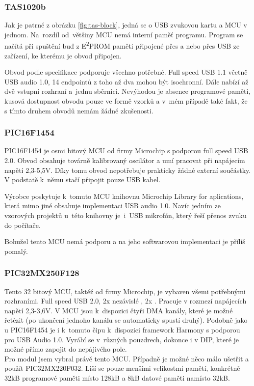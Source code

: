 \subsubsection{TAS1020b}	

Jak je patrné z obrázku \ref{fig:tas-block}, jedná se o USB \iis zvukovou kartu a MCU v jednom. Na~rozdíl od~většiny MCU nemá interní paměť programu. Program se načítá při spuštění buď z E\textsuperscript{2}PROM  paměti připojené přes \iic a nebo přes USB ze zařízení, ke kterému je obvod připojen.

Obvod podle specifikace \cite{tas} podporuje všechno potřebné. Full speed USB 1.1 včetně USB audio 1.0, 14 endpointů z toho až dva mohou být isochronní. Dále nabízí až dvě vstupní \iis rozhraní a~jednu \iic sběrnici. Nevýhodou je absence programové paměti, kusová dostupnost obvodu pouze ve formě vzorků a v~mém případě také fakt, že s tímto druhem obvodů nemám žádné zkušenosti.

\subsubsection{PIC16F1454}
PIC16F1454 je osmi bitový MCU od firmy Microchip s podporou full speed USB 2.0. Obvod obsahuje továrně kalibrovaný oscilátor a umí pracovat při napájecím napětí 2,3-5,5V. Díky tomu obvod nepotřebuje prakticky žádné externí součástky. V podstatě k~němu stačí připojit pouze USB kabel.

Výrobce poskytuje k~tomuto MCU knihovnu Microchip Library for aplications, která mimo jiné obsahuje implementaci USB audio 1.0. Navíc jedním ze vzorových projektů u~této knihovny je~i~USB mikrofón, který řeší přenos zvuku do počítače.

Bohužel tento MCU nemá podporu \iis a na jeho softwarovou implementaci je příliš pomalý. 

\subsubsection{PIC32MX250F128}
Tento 32 bitový MCU, taktéž od firmy Microchip, je vybaven všemi potřebnými rozhraními. Full speed USB 2.0, 2x nezávislé \iis, 2x \iic. Pracuje v rozmezí napájecích napětí 2,3-3,6V. V MCU jsou k~dispozici čtyři DMA kanály, které je možné řetězit (po ukončení jednoho kanálu se automaticky spustí druhý). Podobně jako u PIC16F1454 je i k~tomuto čipu k~dispozici framework Harmony \cite{harmony} s podporou pro USB Audio 1.0. Vyrábí se v~různých pouzdrech, dokonce i v DIP, které je možné přímo zapojit do nepájivého pole.\\
Pro modul jsem vybral právě tento MCU. Případně je možné něco málo ušetřit a použít PIC32MX220F032. Liší se pouze menšími velikostmi pamětí, konkrétně 32kB programové paměti místo 128kB a 8kB datové paměti namísto 32kB.

